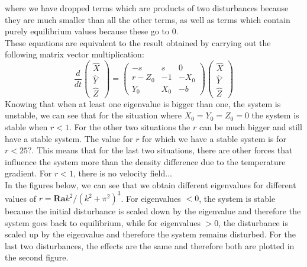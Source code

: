 \documentclass{article}
\begin{document}
where we have dropped terms which are products of two disturbances because they are much smaller than all the other terms, as well as terms which contain purely equilibrium values because these go to 0. \\

These equations are equivalent to the result obtained by carrying out the following matrix vector multiplication:
\begin{equation*}
    \frac{d}{dt}\begin{pmatrix}
    \hat{X} \\ \hat{Y} \\ \hat{Z}
    \end{pmatrix} = \begin{pmatrix}
    -s & s & 0 \\
    r - Z_0 & -1 & -X_0 \\
    Y_0 & X_0 & -b
    \end{pmatrix}\begin{pmatrix}
    \hat{X} \\ \hat{Y} \\ \hat{Z}
    \end{pmatrix} 
\end{equation*}
Knowing that when at least one eigenvalue is bigger than one, the system is unstable, we can see that for the situation where $X_0 = Y_0 = Z_0 = 0$ the system is stable when $r<1$. For the other two situations the $r$ can be much bigger and still have a stable system. The value for $r$ for which we have a stable system is for $r < 25?$. This means that for the last two situations, there are other forces that influence the system more than the density difference due to the temperature gradient.
For $r<1$, there is no velocity field... \\

In the figures below, we can see that we obtain different eigenvalues for different values of $r = \boldsymbol{Ra}k^2/(k^2 + \pi^2)^3$. For eigenvalues $<0$, the system is stable because the initial disturbance is scaled down by the eigenvalue and therefore the system goes back to equilibrium, while for eigenvalues $>0$, the disturbance is scaled up by the eigenvalue and therefore the system remains disturbed. For the last two disturbances, the effects are the same and therefore both are plotted in the second figure.
\end{document}
